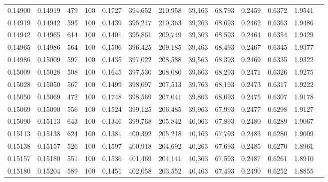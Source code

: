\begin{tabular}{rrrrrrrrrrrrr}
0.14900 & 0.14919 &   479 & 100 &                                     0.1727 & 394,652 & 210,958 &  39,163 &  68,793 & 0.2459 & 0.6372 & 1.9541 \\
0.14919 & 0.14942 &   595 & 100 &                                     0.1439 & 395,247 & 210,363 &  39,263 &  68,693 & 0.2462 & 0.6363 & 1.9486 \\
0.14942 & 0.14965 &   614 & 100 &                                     0.1401 & 395,861 & 209,749 &  39,363 &  68,593 & 0.2464 & 0.6354 & 1.9429 \\
0.14965 & 0.14986 &   564 & 100 &                                     0.1506 & 396,425 & 209,185 &  39,463 &  68,493 & 0.2467 & 0.6345 & 1.9377 \\
0.14986 & 0.15009 &   597 & 100 &                                     0.1435 & 397,022 & 208,588 &  39,563 &  68,393 & 0.2469 & 0.6335 & 1.9322 \\
0.15009 & 0.15028 &   508 & 100 &                                     0.1645 & 397,530 & 208,080 &  39,663 &  68,293 & 0.2471 & 0.6326 & 1.9275 \\
0.15028 & 0.15050 &   567 & 100 &                                     0.1499 & 398,097 & 207,513 &  39,763 &  68,193 & 0.2473 & 0.6317 & 1.9222 \\
0.15050 & 0.15069 &   472 & 100 &                                     0.1748 & 398,569 & 207,041 &  39,863 &  68,093 & 0.2475 & 0.6307 & 1.9178 \\
0.15069 & 0.15090 &   556 & 100 &                                     0.1524 & 399,125 & 206,485 &  39,963 &  67,993 & 0.2477 & 0.6298 & 1.9127 \\
0.15090 & 0.15113 &   643 & 100 &                                     0.1346 & 399,768 & 205,842 &  40,063 &  67,893 & 0.2480 & 0.6289 & 1.9067 \\
0.15113 & 0.15138 &   624 & 100 &                                     0.1381 & 400,392 & 205,218 &  40,163 &  67,793 & 0.2483 & 0.6280 & 1.9009 \\
0.15138 & 0.15157 &   526 & 100 &                                     0.1597 & 400,918 & 204,692 &  40,263 &  67,693 & 0.2485 & 0.6270 & 1.8961 \\
0.15157 & 0.15180 &   551 & 100 &                                     0.1536 & 401,469 & 204,141 &  40,363 &  67,593 & 0.2487 & 0.6261 & 1.8910 \\
0.15180 & 0.15204 &   589 & 100 &                                     0.1451 & 402,058 & 203,552 &  40,463 &  67,493 & 0.2490 & 0.6252 & 1.8855 \\

\end{tabular}
